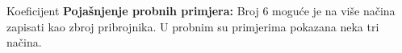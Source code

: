 \begin{statement}[
  problempoints=20,
  timelimit=1 sekunda,
  memorylimit=512 MiB,
]{Koeficijent}
\textbf{Pojašnjenje probnih primjera:}
Broj $6$ moguće je na više načina zapisati kao zbroj pribrojnika. U probnim su
primjerima pokazana neka tri načina.

\end{statement}

